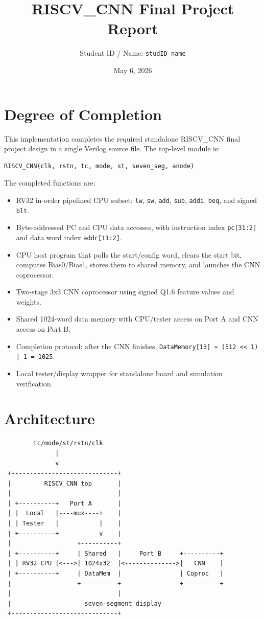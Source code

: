 \documentclass[11pt]{article}
\title{RISCV\_CNN Final Project Report}
\author{Student ID / Name: \texttt{studID\_name}}
\date{May 6, 2026}
\begin{document}
\maketitle

\section{Degree of Completion}

This implementation completes the required standalone RISCV\_CNN final project design in a single Verilog source file. The top-level module is:

\begin{verbatim}
RISCV_CNN(clk, rstn, tc, mode, st, seven_seg, anode)
\end{verbatim}

The completed functions are:
\begin{itemize}
  \item RV32 in-order pipelined CPU subset: \texttt{lw}, \texttt{sw}, \texttt{add}, \texttt{sub}, \texttt{addi}, \texttt{beq}, and signed \texttt{blt}.
  \item Byte-addressed PC and CPU data accesses, with instruction index \texttt{pc[31:2]} and data word index \texttt{addr[11:2]}.
  \item CPU host program that polls the start/config word, clears the start bit, computes Bias0/Bias1, stores them to shared memory, and launches the CNN coprocessor.
  \item Two-stage 3x3 CNN coprocessor using signed Q1.6 feature values and weights.
  \item Shared 1024-word data memory with CPU/tester access on Port A and CNN access on Port B.
  \item Completion protocol: after the CNN finishes, \texttt{DataMemory[13] = (512 << 1) | 1 = 1025}.
  \item Local tester/display wrapper for standalone board and simulation verification.
\end{itemize}

\section{Architecture}

\begin{verbatim}
        tc/mode/st/rstn/clk
              |
              v
 +-----------------------------+
 |         RISCV_CNN top       |
 |                             |
 | +----------+   Port A       |
 | |  Local   |----mux----+    |
 | | Tester   |           |    |
 | +----------+           v    |
 |                  +----------+
 | +----------+     | Shared   |     Port B     +----------+
 | | RV32 CPU |<--->| 1024x32  |<-------------->|   CNN    |
 | +----------+     | DataMem  |                | Coproc   |
 |                  +----------+                +----------+
 |                             |
 |                    seven-segment display
 +-----------------------------+
\end{verbatim}
\end{document}
